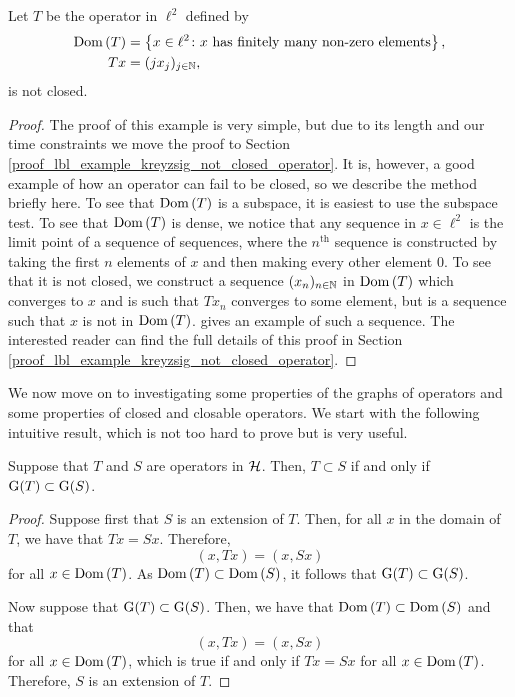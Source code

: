 \begin{example}\label{lbl_example_kreyzsig_not_closed_operator}
  Let $T$ be the operator in $\ell^2$ defined by
  \begin{align*}
    \operatorname{Dom}\left(T\right) &= \left\{x \in \ell^2 \colon \text{$x$ has finitely many non-zero elements}\right\}, \\
    Tx &= (jx_j)_{j \in \mathbb{N}},
  \end{align*}
  is not closed.
\end{example}
\begin{proof}
  The proof of this example is very simple, but due to its length and our time constraints we move the proof to Section \eqref{proof_lbl_example_kreyzsig_not_closed_operator}. It is, however, a good example of how an operator can fail to be closed, so we describe the method briefly here. To see that $\operatorname{Dom}\left(T\right)$ is a subspace, it is easiest to use the subspace test. To see that $\operatorname{Dom}\left(T\right)$ is dense, we notice that any sequence in $x \in \ell^2$ is the limit point of a sequence of sequences, where the $n^\text{th}$ sequence is constructed by taking the first $n$ elements of $x$ and then making every other element $0$. To see that it is not closed, we construct a sequence $(x_n)_{n \in \mathbb{N}}$ in $\operatorname{Dom}\left(T\right)$ which converges to $x$ and is such that $Tx_n$ converges to some element, but is a sequence such that  $x$ is not in $\operatorname{Dom}\left(T\right)$. {\cite[Problem 1, Chapter 10.3]{kreyszig}} gives an example of such a sequence. The interested reader can find the full details of this proof in Section \eqref{proof_lbl_example_kreyzsig_not_closed_operator}.
\end{proof}

We now move on to investigating some properties of the graphs of operators and some properties of closed and closable operators. We start with the following intuitive result, which is not too hard to prove but is very useful.

\begin{proposition}\label{lbl_prop_extension_iff_graphs_subset}
  Suppose that $T$ and $S$ are operators in $\mathcal{H}$. Then, $T \subset S$ if and only if $\operatorname{G}(T) \subset \operatorname{G}(S)$.
\end{proposition}
\begin{proof}
  Suppose first that $S$ is an extension of $T$. Then, for all $x$ in the domain of $T$, we have that $Tx = Sx$. Therefore,
  \begin{equation*}
    (x, Tx) = (x, Sx)
  \end{equation*}
  for all $x \in \operatorname{Dom}\left(T\right)$. As $\operatorname{Dom}\left(T\right) \subset \operatorname{Dom}\left(S\right)$, it follows that $\operatorname{G}(T) \subset \operatorname{G}(S)$.

  Now suppose that $\operatorname{G}(T) \subset \operatorname{G}(S)$. Then, we have that $\operatorname{Dom}\left(T\right) \subset \operatorname{Dom}\left(S\right)$ and that
  \begin{equation*}
    (x, Tx) = (x, Sx)
  \end{equation*}
  for all $x \in \operatorname{Dom}\left(T\right)$, which is true if and only if $Tx = Sx$ for all $x \in \operatorname{Dom}\left(T\right)$. Therefore, $S$ is an extension of $T$.
\end{proof}

